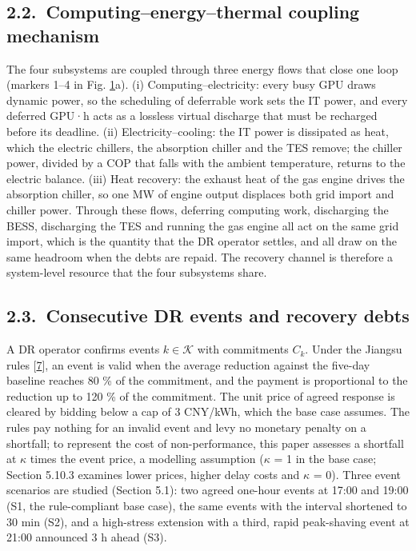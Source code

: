 \documentclass[a4paper,twocolumn,fleqn,10pt]{article}
\begin{document}
\subsection*{2.2.~Computing--energy--thermal coupling mechanism}

The four subsystems are coupled through three energy flows that close one loop (markers 1--4 in Fig. \hyperref[fig1]{1}a). (i) Computing--electricity: every busy GPU draws dynamic power, so the scheduling of deferrable work sets the IT power, and every deferred GPU·h acts as a lossless virtual discharge that must be recharged before its deadline. (ii) Electricity--cooling: the IT power is dissipated as heat, which the electric chillers, the absorption chiller and the TES remove; the chiller power, divided by a COP that falls with the ambient temperature, returns to the electric balance. (iii) Heat recovery: the exhaust heat of the gas engine drives the absorption chiller, so one MW of engine output displaces both grid import and chiller power. Through these flows, deferring computing work, discharging the BESS, discharging the TES and running the gas engine all act on the same grid import, which is the quantity that the DR operator settles, and all draw on the same headroom when the debts are repaid. The recovery channel is therefore a system-level resource that the four subsystems share.

\subsection*{2.3.~Consecutive DR events and recovery debts}

A DR operator confirms events \(k\in\mathcal K\) with commitments \(C_k\). Under the Jiangsu rules [\hyperlink{ref7}{7}], an event is valid when the average reduction against the five-day baseline reaches 80 \% of the commitment, and the payment is proportional to the reduction up to 120 \% of the commitment. The unit price of agreed response is cleared by bidding below a cap of 3 CNY/kWh, which the base case assumes. The rules pay nothing for an invalid event and levy no monetary penalty on a shortfall; to represent the cost of non-performance, this paper assesses a shortfall at \(\kappa\) times the event price, a modelling assumption (\(\kappa\) = 1 in the base case; Section 5.10.3 examines lower prices, higher delay costs and \(\kappa\) = 0). Three event scenarios are studied (Section 5.1): two agreed one-hour events at 17:00 and 19:00 (S1, the rule-compliant base case), the same events with the interval shortened to 30 min (S2), and a high-stress extension with a third, rapid peak-shaving event at 21:00 announced 3 h ahead (S3).
\end{document}
